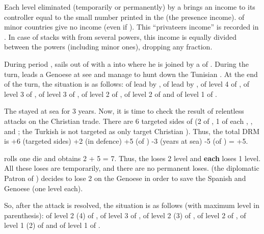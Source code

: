  Each level eliminated (temporarily or
permanently) by a \corsaire brings an income to its controller equal to the
small number printed in the \STZ (the presence income). \corsaire of minor
countries give no income (even if \VASSAL).
\bparag This ``privateers income'' is recorded in .
\bparag In case of stacks with \corsaire from several powers, this income is
equally divided between the powers (including minor ones), dropping any
fraction.

\begin{exemple}
  During period ,  sails out of
  \villeAlger with a \corsaire\faceplus into  where he is joined
  by a \corsaire\facemoins of \paysTunisie. During the turn,  leads a Genoese \FLEET\facemoins at see and manage to hunt down the
  Tunisian \corsaire. At the end of the turn, the situation is as follows:
  \corsaire\faceplus of \paysAlgerie lead by ,
  \FLEET\facemoins of \paysGenes lead by ,
  \TradeFLEET\faceplus of level 4 of \FRA, \TradeFLEET\facemoins of level 3 of
  \paysHollande, \TradeFLEET\facemoins of level 3 of \paysGenes,
  \TradeFLEET\facemoins of level 2 of \SPA, \TradeFLEET\facemoins of level 2
  of \VEN and \TradeFLEET\facemoins of level 1 of \TUR.

  The \corsaire stayed at sea for 3 years. Now, it is time to check the result
  of  relentless attacks on the Christian trade. There are 6
  targeted sides of \TradeFLEET (2 of \FRA, 1 of each \paysHollande,
  \paysGenes, \HIS and \VEN; the Turkish \TradeFLEET is not targeted as
  \Barbaresques only target Christian \TradeFLEET). Thus, the total DRM is +6
  (targeted sides) +2 (\FLEET\facemoins in defence) +5 (\Man of ) -3 (years at sea) -5 (\Man of ) = +5.

  \TUR rolls one die and obtains 2 + 5 = 7. Thus, the \TradeFLEET\faceplus
  loses 2 level and \textbf{each} \TradeFLEET\facemoins loses 1 level. All
  these loses are temporarily, and there are no permanent loses. \HIS (the
  diplomatic Patron of \paysGenes) decides to lose 2 \NGD on the Genoese
  \FLEET in order to save the Spanish and Genoese \TradeFLEET (one level
  each).

  So, after the attack is resolved, the situation is as follows (with maximum
  level in parenthesis): \TradeFLEET\facemoins of level 2 (4) of \FRA,
  \TradeFLEET\facemoins of level 3 of \paysGenes, \TradeFLEET\facemoins of
  level 2 (3) of \paysHollande, \TradeFLEET\facemoins of level 2 of \HIS,
  \TradeFLEET\facemoins of level 1 (2) of \VEN and \TradeFLEET\facemoins of
  level 1 of \TUR.


\end{exemple}
